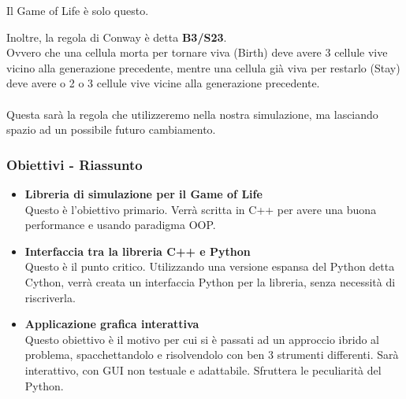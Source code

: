 \documentclass[11pt]{beamer}
\begin{document}
\begin{frame}
\begin{center}
	\huge Il Game of Life è solo questo.
\end{center}
\normalsize Inoltre, la regola di Conway è detta \textbf{B3/S23}.\\
Ovvero che una cellula morta per tornare viva (Birth) deve avere 3 cellule vive vicino alla generazione precedente, mentre una cellula già viva per restarlo (Stay) deve avere o 2 o 3 cellule vive vicine alla generazione precedente.\\\\
Questa sarà la regola che utilizzeremo nella nostra simulazione, ma lasciando spazio ad un possibile futuro cambiamento.
\end{frame}

\begin{frame}
\frametitle{Obiettivi - Riassunto}
\begin{itemize}
	\pause
	\item \textbf{Libreria di simulazione per il Game of Life} \\
	Questo è l'obiettivo primario. Verrà scritta in C++ per avere una buona performance e usando paradigma OOP.
	\pause
	\item \textbf{Interfaccia tra la libreria C++ e Python} \\
	Questo è il punto critico. Utilizzando una versione espansa del Python detta Cython, verrà creata un interfaccia Python per la libreria, senza necessità di riscriverla.
	\pause
	\item \textbf{Applicazione grafica interattiva} \\
	Questo obiettivo è il motivo per cui si è passati ad un approccio ibrido al problema, spacchettandolo e risolvendolo con ben 3 strumenti differenti. Sarà interattivo, con GUI non testuale e adattabile. Sfruttera le peculiarità del Python.
\end{itemize}
\end{frame}
\end{document}

